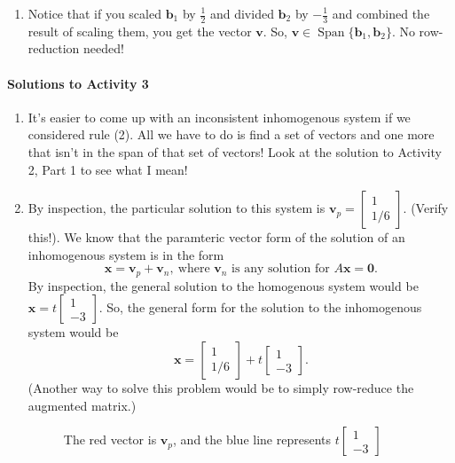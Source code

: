 \documentclass[titlepage, a4paper, 10pt]{article}
\renewcommand{\vec}[1]{\mathbf{#1}}
\DeclareMathOperator{\vspan}{Span}
\begin{document}
\begin{enumerate}
\item Notice that if you scaled \(\vec{b}_1\) by \(\frac{1}{2}\) and divided \(\vec{b}_2\) by \(-\frac{1}{3}\) and combined the result of scaling them, you get the
vector \(\vec{v}\). So, \(\vec{v} \in \vspan\{\vec{b}_1, \vec{b}_2\}\). No row-reduction needed!
\end{enumerate}

\paragraph{Solutions to Activity 3}
\begin{enumerate}
\item It's easier to come up with an inconsistent inhomogenous system if we considered rule (2). All we have to do is find a set of vectors and one more that isn't 
in the span of that set of vectors! Look at the solution to Activity 2, Part 1 to see what I mean!
\item By inspection, the particular solution to this system is \(\vec{v}_p = \begin{bmatrix}1 \\ 1/6\end{bmatrix}\). (Verify this!). We know that the paramteric 
vector form of the solution of an inhomogenous system is in the form \[\vec{x} = \vec{v}_p + \vec{v}_n, \ \text{where } \vec{v}_n \text{ is any solution for } A\vec{x} = \vec{0}.\] By inspection, the general solution to the homogenous system would be \(\vec{x} = t\begin{bmatrix}1 \\ -3\end{bmatrix}\). So, the general
form for the solution to the inhomogenous system would be \[\vec{x} = \begin{bmatrix}1 \\ 1/6\end{bmatrix} + t\begin{bmatrix}1 \\ -3\end{bmatrix}.\]
(Another way to solve this problem would be to simply row-reduce the augmented matrix.)
\begin{figure}[!h]
	\centering
	\caption{The red vector is \(\vec{v}_p\), and the blue line represents \(t\begin{bmatrix}1 \\ -3\end{bmatrix}\)}
\end{figure}
\end{enumerate}
\end{document}
